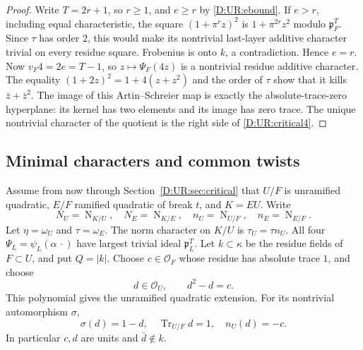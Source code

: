 \documentclass[11pt]{amsart}
\theoremstyle{definition}
\theoremstyle{remark}
\newcommand{\Tr}{\operatorname{Tr}}
\newcommand{\Nm}{\operatorname{N}}
\newcommand{\OO}{\mathcal O}\newcommand{\pp}{\mathfrak p}\newcommand{\PP}{\mathfrak P}
\begin{document}
\begin{proof}
Write $T=2r+1$, so $r\ge1$, and $e\ge r$ by \eqref{D:UR:ebound}.
If $e>r$, including equal characteristic, the square
$(1+\pi^rz)^2$ is $1+\pi^{2r}z^2$ modulo $\pp_F^T$.
Since $\tau$ has order $2$, this would make its nontrivial last-layer
additive character trivial on every residue square. Frobenius is onto
$k$, a contradiction. Hence $e=r$.
Now $v_F4=2e=T-1$, so $z\mapsto\Psi_F(4z)$ is a nontrivial residue
additive character. The equality
$(1+2z)^2=1+4(z+z^2)$ and the order of $\tau$ show that it kills
$\bar z+\bar z^2$. The image of this Artin--Schreier map is exactly the
absolute-trace-zero hyperplane: its kernel has two elements and its image
has zero trace. The unique nontrivial character of the quotient is the
right side of \eqref{D:UR:critical4}.
\end{proof}

\subsection{Minimal characters and common twists}
Assume from now through Section~\ref{D:UR:sec:critical} that $U/F$ is unramified
quadratic, $E/F$ ramified quadratic of break $t$, and $K=EU$. Write
\[
 N_U=\Nm_{K/U},\quad N_E=\Nm_{K/E},\quad
 n_U=\Nm_{U/F},\quad n_E=\Nm_{E/F}.
\]
Let $\eta=\omega_U$ and $\tau=\omega_E$. The norm character on $K/U$ is
$\tau_U=\tau n_U$. All four $\Psi_L=\psi_L(\alpha\,\cdot)$ have largest
trivial ideal $\pp_L^T$. Let $k\subset\kappa$ be the residue fields of
$F\subset U$, and put $Q=|k|$.
Choose $c\in\OO_F$ whose residue has absolute trace $1$, and choose
\begin{equation}\label{D:UR:dchoice}
 d\in\OO_U,\qquad d^2-d=c.
\end{equation}
This polynomial gives the unramified quadratic extension. For its
nontrivial automorphism $\sigma$,
\[
 \sigma(d)=1-d,\quad \Tr_{U/F}d=1,\quad n_U(d)=-c.
\]
In particular $c,d$ are units and $\bar d\notin k$.
\end{document}
